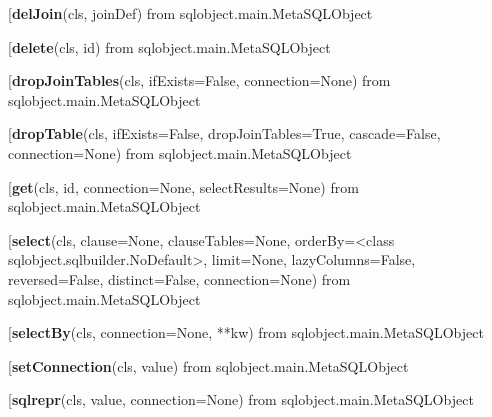 \begin{description}\item[{\bf delJoin}(cls, joinDef) from sqlobject.main.MetaSQLObject\end{description}

\begin{description}\item[{\bf delete}(cls, id) from sqlobject.main.MetaSQLObject\end{description}

\begin{description}\item[{\bf dropJoinTables}(cls, ifExists=False, connection=None) from sqlobject.main.MetaSQLObject\end{description}

\begin{description}\item[{\bf dropTable}(cls, ifExists=False, dropJoinTables=True, cascade=False, connection=None) from sqlobject.main.MetaSQLObject\end{description}

\begin{description}\item[{\bf get}(cls, id, connection=None, selectResults=None) from sqlobject.main.MetaSQLObject\end{description}

\begin{description}\item[{\bf select}(cls, clause=None, clauseTables=None, orderBy=<class sqlobject.sqlbuilder.NoDefault>, limit=None, lazyColumns=False, reversed=False, distinct=False, connection=None) from sqlobject.main.MetaSQLObject\end{description}

\begin{description}\item[{\bf selectBy}(cls, connection=None, **kw) from sqlobject.main.MetaSQLObject\end{description}

\begin{description}\item[{\bf setConnection}(cls, value) from sqlobject.main.MetaSQLObject\end{description}

\begin{description}\item[{\bf sqlrepr}(cls, value, connection=None) from sqlobject.main.MetaSQLObject\end{description}


